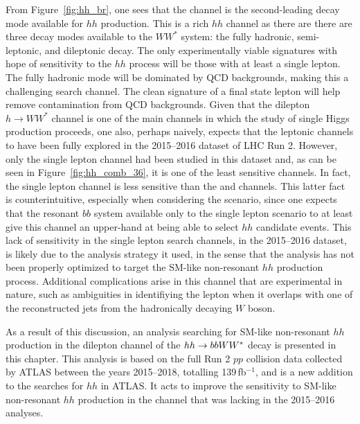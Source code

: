 From Figure~\ref{fig:hh_br}, one sees that the \bbww channel is the second-leading decay mode
available for $hh$ production.
This is a rich $hh$ channel as there are there are three decay modes available to the $WW^*$ system: the fully hadronic, semi-leptonic, and dileptonic decay.
The only experimentally viable signatures with hope of sensitivity to the $hh$ process will be those with at least a single lepton.
The fully hadronic mode will be dominated by QCD backgrounds, making this a challenging search channel.
The clean signature of a final state lepton will help remove contamination from QCD backgrounds.
Given that the dilepton $h \rightarrow WW^*$ channel is one of the main channels in which the study
of single Higgs production proceeds, one also, perhaps naively, expects that the leptonic \bbww 
channels to have been fully explored in the 2015--2016 dataset of LHC Run 2.
However, only the single lepton channel had been studied in this dataset and, as can be seen in Figure~\ref{fig:hh_comb_36},
it is one of the least sensitive channels.
In fact, the single lepton \bbww channel is less sensitive than the \wwww and \wwyy channels.
This latter fact is counterintuitive, especially when considering the \wwww scenario, since
one expects that the resonant $bb$ system available only to the single lepton \bbww scenario
to at least give this channel an upper-hand at being able to select $hh$ candidate events.
This lack of sensitivity in the single lepton \bbww search channels, in the 2015--2016 dataset, is likely due
to the analysis strategy it used, in the sense that the analysis has not been properly optimized to target
the SM-like non-resonant $hh$ production process.
Additional complications arise in this channel that are experimental in nature, such as ambiguities
in identifiying the lepton when it overlaps with one of the reconstructed jets from the hadronically decaying $W$
boson.

As a result of this discussion, an analysis searching for SM-like non-resonant $hh$ production in the dilepton channel
of the $hh \rightarrow bbWW^*$ decay is presented in this chapter.
This analysis is based on the full Run 2 $pp$ collision data collected by ATLAS between the years
2015--2018, totalling 139\,fb$^{-1}$, and is a new addition to the searches for $hh$ in ATLAS.
It acts to improve the sensitivity to SM-like non-resonant $hh$ production in the \bbww channel that
was lacking in the 2015--2016 analyses.


